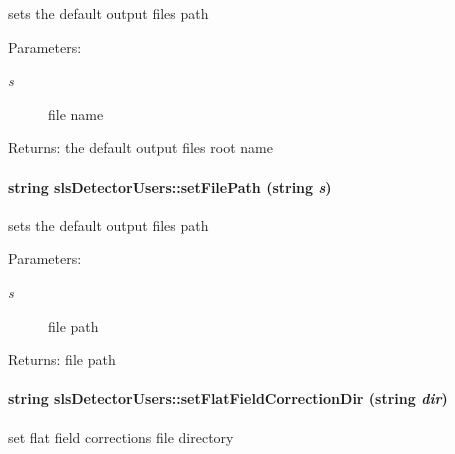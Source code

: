 sets the default output files path 

\begin{Desc}
\item[Parameters:]
\begin{description}
\item[{\em s}]file name \end{description}
\end{Desc}
\begin{Desc}
\item[Returns:]the default output files root name \end{Desc}
\hypertarget{classslsDetectorUsers_d833e1051299e101a5b5097c598ba9cb}{
\paragraph[setFilePath]{\setlength{\rightskip}{0pt plus 5cm}string sls\-Detector\-Users::set\-File\-Path (string {\em s})}\hfill}
\label{classslsDetectorUsers_d833e1051299e101a5b5097c598ba9cb}


sets the default output files path 

\begin{Desc}
\item[Parameters:]
\begin{description}
\item[{\em s}]file path \end{description}
\end{Desc}
\begin{Desc}
\item[Returns:]file path \end{Desc}
\hypertarget{classslsDetectorUsers_65b112dac3d8b94f219f4d64c13cf0f9}{
\paragraph[setFlatFieldCorrectionDir]{\setlength{\rightskip}{0pt plus 5cm}string sls\-Detector\-Users::set\-Flat\-Field\-Correction\-Dir (string {\em dir})}\hfill}
\label{classslsDetectorUsers_65b112dac3d8b94f219f4d64c13cf0f9}


set flat field corrections file directory 

